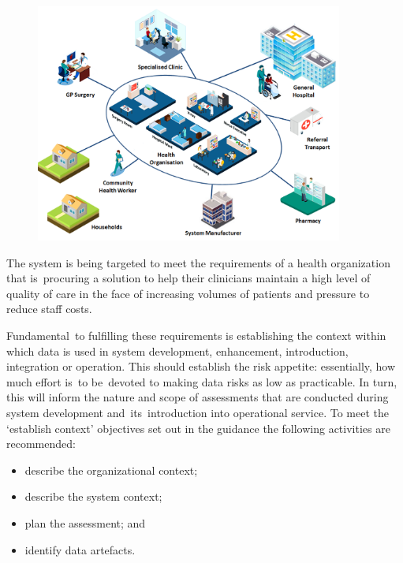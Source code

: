 \begin{figure}[H]
  \centering
  \includegraphics[width=0.9\textwidth]{images/medicalscenario}
  \label{fig:medicalscenario}
\end{figure}

\clearpage
The system is being targeted to meet the requirements of a health organization \cbstart that is\cbend\ procuring a solution to help their clinicians maintain a high level of quality of care in the face of increasing volumes of patients and pressure to reduce staff costs.

\cbstart Fundamental\cbend\ to fulfilling these requirements is establishing the context within which \cbstart data is used in system development, enhancement, introduction, integration or operation\cbend. This should establish the risk appetite: essentially, how much effort is\cbstart\ to be\cbend\ devoted to making data risks as low as practicable. In turn, this will inform the nature and scope of assessments that are conducted during system development and\cbstart\ its\cbend\ introduction into operational service. To meet the `establish context' objectives set out in the guidance the following activities are recommended:

\begin{itemize}
	\item describe the organizational context;
	\item describe the system context;
	\item plan the assessment; and
	\item identify \glspl{data artefact}.
\end{itemize}

